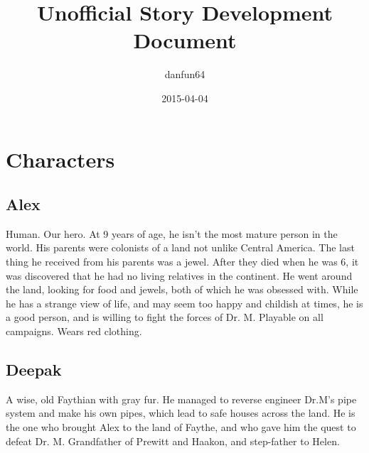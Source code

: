 \documentclass{gd-document}
\begin{document}
\title{Unofficial Story Development Document}
\author{danfun64}
\date{2015-04-04}

\maketitle{}

\tableofcontents

\section{Characters}

\subsection{Alex}

Human. Our hero. At 9 years of age, he isn't the most mature person in
the world. His parents were colonists of a land not unlike Central
America. The last thing he received from his parents was a
jewel. After they died when he was 6, it was discovered that he had no
living relatives in the continent. He went around the land, looking
for food and jewels, both of which he was obsessed with. While he has
a strange view of life, and may seem too happy and childish at times,
he is a good person, and is willing to fight the forces of
Dr. M. Playable on all campaigns. Wears red clothing.

\subsection{Deepak}

A wise, old Faythian with gray fur. He managed to reverse engineer
Dr.M's pipe system and make his own pipes, which lead to safe houses
across the land. He is the one who brought Alex to the land of Faythe,
and who gave him the quest to defeat Dr. M. Grandfather of Prewitt and
Haakon, and step-father to Helen.
\end{document}
